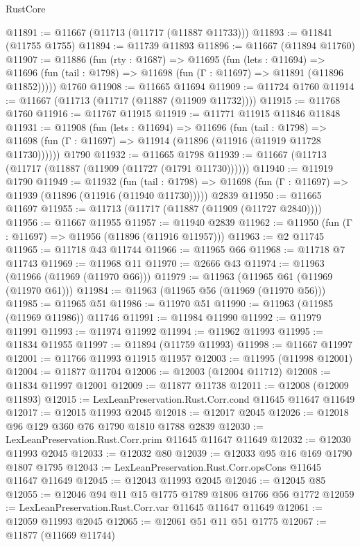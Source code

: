 \begin{lexlean}{RustCore}
\begin{coremodule}
@11891 := @11667 (@11713 (@11717 (@11887 @11733)))
@11893 := @11841 (@11755 @1755)
@11894 := @11739 @11893
@11896 := @11667 (@11894 @11760)
@11907 := @11886
    (fun (rty : @1687) =>
    @11695
      (fun (lets : @11694) =>
      @11696 (fun (tail : @1798) => @11698 (fun (Γ : @11697) => @11891 (@11896 @11852)))))
    @1760
@11908 := @11665 @11694
@11909 := @11724 @1760
@11914 := @11667 (@11713 (@11717 (@11887 (@11909 @11732))))
@11915 := @11768 @1760
@11916 := @11767 @11915
@11919 := @11771 @11915 @11846 @11848
@11931 := @11908
    (fun (lets : @11694) =>
    @11696
      (fun (tail : @1798) =>
      @11698 (fun (Γ : @11697) => @11914 (@11896 (@11916 (@11919 @11728 @11730))))))
    @1790
@11932 := @11665 @1798
@11939 := @11667 (@11713 (@11717 (@11887 (@11909 (@11727 (@1791 @11730))))))
@11940 := @11919 @1790
@11949 := @11932
    (fun (tail : @1798) => @11698 (fun (Γ : @11697) => @11939 (@11896 (@11916 (@11940 @11730)))))
    @2839
@11950 := @11665 @11697
@11955 := @11713 (@11717 (@11887 (@11909 (@11727 @2840))))
@11956 := @11667 @11955
@11957 := @11940 @2839
@11962 := @11950 (fun (Γ : @11697) => @11956 (@11896 (@11916 @11957)))
@11963 := @2 @11745
@11965 := @11718 @43 @11744
@11966 := @11965 @66
@11968 := @11718 @7 @11743
@11969 := @11968 @11
@11970 := @2666 @43
@11974 := @11963 (@11966 (@11969 (@11970 @66)))
@11979 := @11963 (@11965 @61 (@11969 (@11970 @61)))
@11984 := @11963 (@11965 @56 (@11969 (@11970 @56)))
@11985 := @11965 @51
@11986 := @11970 @51
@11990 := @11963 (@11985 (@11969 @11986)) @11746
@11991 := @11984 @11990
@11992 := @11979 @11991
@11993 := @11974 @11992
@11994 := @11962 @11993
@11995 := @11834 @11955
@11997 := @11894 (@11759 @11993)
@11998 := @11667 @11997
@12001 := @11766 @11993 @11915 @11957
@12003 := @11995 (@11998 @12001)
@12004 := @11877 @11704
@12006 := @12003 (@12004 @11712)
@12008 := @11834 @11997 @12001
@12009 := @11877 @11738
@12011 := @12008 (@12009 @11893)
@12015 := LexLeanPreservation.Rust.Corr.cond @11645 @11647 @11649
@12017 := @12015 @11993 @2045
@12018 := @12017 @2045
@12026 := @12018 @96 @129 @360 @76 @1790 @1810 @1788 @2839
@12030 := LexLeanPreservation.Rust.Corr.prim @11645 @11647 @11649
@12032 := @12030 @11993 @2045
@12033 := @12032 @80
@12039 := @12033 @95 @16 @169 @1790 @1807 @1795
@12043 := LexLeanPreservation.Rust.Corr.opsCons @11645 @11647 @11649
@12045 := @12043 @11993 @2045
@12046 := @12045 @85
@12055 := @12046 @94 @11 @15 @1775 @1789 @1806 @1766 @56 @1772
@12059 := LexLeanPreservation.Rust.Corr.var @11645 @11647 @11649
@12061 := @12059 @11993 @2045
@12065 := @12061 @51 @11 @51 @1775
@12067 := @11877 (@11669 @11744)

\end{coremodule}
\end{lexlean}
